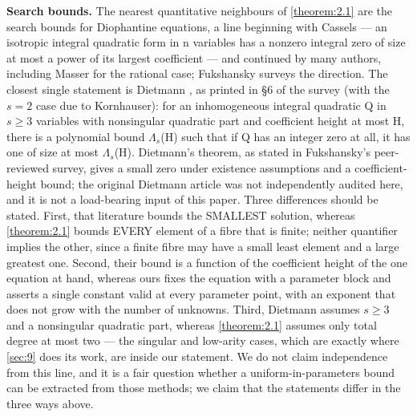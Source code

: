 \documentclass[11pt]{article}
\theoremstyle{plain}
\theoremstyle{definition}
\theoremstyle{remark}
\theoremstyle{plain}
\theoremstyle{definition}
\theoremstyle{remark}
\theoremstyle{plain}
\theoremstyle{definition}
\theoremstyle{remark}
\begin{document}
\textbf{Search bounds.} The nearest quantitative neighbours of \cref{theorem:2.1} are the search bounds for Diophantine equations, a line beginning with Cassels \cite{Cas55} — an isotropic integral quadratic form in n variables has a nonzero integral zero of size at most a power of its largest coefficient — and continued by many authors, including Masser \cite{Mas98} for the rational case; Fukshansky \cite{Fuk13} surveys the direction. The closest single statement is Dietmann \cite{Die03}, as printed in §6 of the survey \cite{Fuk13} (with the $s = 2$ case due to Kornhauser): for an inhomogeneous integral quadratic Q in $s ≥ 3$ variables with nonsingular quadratic part and coefficient height at most H, there is a polynomial bound $Λ_{s}$(H) such that if Q has an integer zero at all, it has one of size at most $Λ_{s}$(H). Dietmann's theorem, as stated in Fukshansky's peer-reviewed survey, gives a small zero under existence assumptions and a coefficient-height bound; the original Dietmann article was not independently audited here, and it is not a load-bearing input of this paper. Three differences should be stated. First, that literature bounds the SMALLEST solution, whereas \cref{theorem:2.1} bounds EVERY element of a fibre that is finite; neither quantifier implies the other, since a finite fibre may have a small least element and a large greatest one. Second, their bound is a function of the coefficient height of the one equation at hand, whereas ours fixes the equation with a parameter block and asserts a single constant valid at every parameter point, with an exponent that does not grow with the number of unknowns. Third, Dietmann assumes $s ≥ 3$ and a nonsingular quadratic part, whereas \cref{theorem:2.1} assumes only total degree at most two — the singular and low-arity cases, which are exactly where \cref{sec:9} does its work, are inside our statement. We do not claim independence from this line, and it is a fair question whether a uniform-in-parameters bound can be extracted from those methods; we claim that the statements differ in the three ways above.

\end{document}
